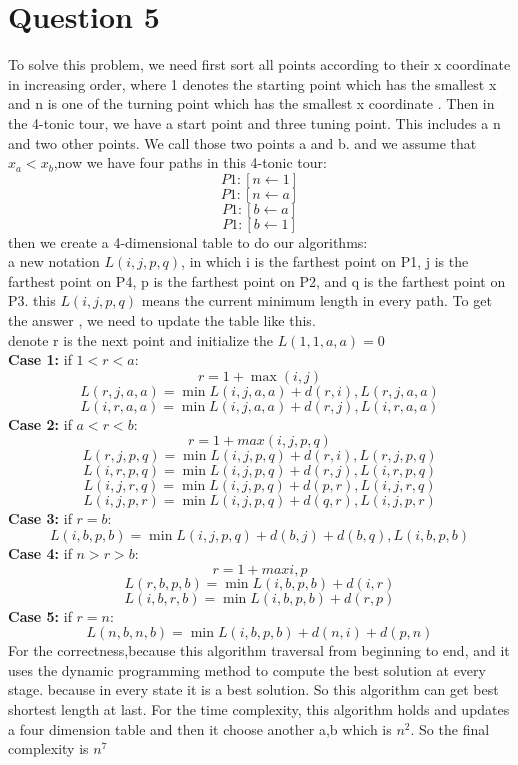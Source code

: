 \documentclass[paper=a4, fontsize=11pt]{scrartcl} %
\numberwithin{equation}{section} %
\numberwithin{figure}{section} %
\numberwithin{table}{section} %
\begin{document}
\section{\textbf{Question 5}}
To solve this problem,  we need first sort all points according to their x coordinate in increasing order, where 1 denotes the starting point which has the smallest x and n is one of the turning point which has the smallest x coordinate . Then in the 4-tonic tour, we have a start point and three tuning point. This includes a n and two other points. We call those two points a and b. and we assume that $x_a<x_b$,now we have four paths in this 4-tonic tour:
$$P1:[n \gets 1]$$
$$P1:[n \gets a]$$
$$P1:[b \gets a]$$
$$P1:[b \gets 1]$$
then we create a 4-dimensional table to do our algorithms:\\
a new notation $L(i,j,p,q)$, in which i is the farthest point on P1, j is the farthest point on P4, p is the farthest point on P2, and q is the farthest point on P3. this $L(i,j,p,q)$ means the current minimum length in every path. To get the answer , we need to update the table like this.\\
denote r is the next point and initialize the $L(1,1,a,a)=0$\\
\textbf{Case 1:} if $1<r<a$:
$$ r=1+\max(i,j)$$
$$ L(r,j,a,a)=\min{L(i,j,a,a)+d(r,i),L(r,j,a,a)}$$
$$ L(i,r,a,a)=\min{L(i,j,a,a)+d(r,j),L(i,r,a,a)}$$
\textbf{Case 2:} if $a<r<b$:
$$ r=1+max(i,j,p,q)$$
$$ L(r,j,p,q)=\min{L(i,j,p,q)+d(r,i),L(r,j,p,q)}$$
$$ L(i,r,p,q)=\min{L(i,j,p,q)+d(r,j),L(i,r,p,q)}$$
$$ L(i,j,r,q)=\min{L(i,j,p,q)+d(p,r),L(i,j,r,q)}$$
$$ L(i,j,p,r)=\min{L(i,j,p,q)+d(q,r),L(i,j,p,r)}$$
\textbf{Case 3:} if $r=b$:
$$L(i,b,p,b)=\min{L(i,j,p,q)+d(b,j)+d(b,q),L(i,b,p,b)}$$
\textbf{Case 4:} if $n>r>b$:
$$r=1+max{i,p}$$
$$L(r,b,p,b)=\min{L(i,b,p,b)+d(i,r)}$$
$$L(i,b,r,b)=\min{L(i,b,p,b)+d(r,p)}$$
\textbf{Case 5:} if $r=n$:
$$L(n,b,n,b)=\min{L(i,b,p,b)+d(n,i)+d(p,n)}$$
For the correctness,because this algorithm traversal from beginning to end, and it uses the dynamic programming method to compute the best solution at every stage. because in every state it is a best solution. So this algorithm can get best shortest length at last.
For the time complexity, this algorithm holds and updates a four dimension table and then it choose another a,b which is $n^2$. So the final complexity is $n^7$
\end{document}
